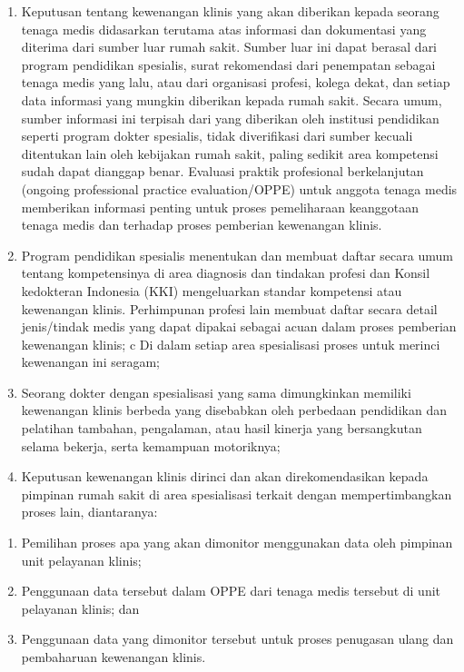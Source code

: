 \documentclass[
]{book}
\providecommand{\tightlist}{%
  \setlength{\itemsep}{0pt}\setlength{\parskip}{0pt}}
\begin{document}
\begin{enumerate}
\def\labelenumi{\alph{enumi}.}
\tightlist
\item
  Keputusan tentang kewenangan klinis yang akan diberikan kepada seorang tenaga medis didasarkan terutama atas informasi dan dokumentasi yang diterima dari sumber luar rumah sakit. Sumber luar ini dapat berasal dari program pendidikan spesialis, surat rekomendasi dari penempatan sebagai tenaga medis yang lalu, atau dari organisasi profesi, kolega dekat, dan setiap data informasi yang mungkin diberikan kepada rumah sakit. Secara umum, sumber informasi ini terpisah dari yang diberikan oleh institusi pendidikan seperti program dokter spesialis, tidak diverifikasi dari sumber kecuali ditentukan lain oleh kebijakan rumah sakit, paling sedikit area kompetensi sudah dapat dianggap benar.
  Evaluasi praktik profesional berkelanjutan (ongoing professional practice evaluation/OPPE) untuk anggota tenaga medis memberikan informasi penting untuk proses pemeliharaan keanggotaan tenaga medis dan terhadap proses pemberian kewenangan klinis.
\item
  Program pendidikan spesialis menentukan dan membuat daftar secara umum tentang kompetensinya di area diagnosis dan tindakan profesi dan Konsil kedokteran Indonesia (KKI) mengeluarkan standar kompetensi atau kewenangan klinis. Perhimpunan profesi lain membuat daftar secara detail jenis/tindak medis yang dapat dipakai sebagai acuan dalam proses pemberian kewenangan klinis;
  c Di dalam setiap area spesialisasi proses untuk merinci kewenangan ini seragam;
\item
  Seorang dokter dengan spesialisasi yang sama dimungkinkan memiliki kewenangan klinis berbeda yang disebabkan oleh perbedaan pendidikan dan pelatihan tambahan, pengalaman, atau hasil kinerja yang bersangkutan selama bekerja, serta kemampuan motoriknya;
\item
  Keputusan kewenangan klinis dirinci dan akan direkomendasikan kepada pimpinan rumah sakit di area spesialisasi terkait dengan mempertimbangkan proses lain, diantaranya:
\end{enumerate}

\begin{enumerate}
\def\labelenumi{\arabic{enumi}.}
\tightlist
\item
  Pemilihan proses apa yang akan dimonitor menggunakan data oleh pimpinan unit pelayanan klinis;
\item
  Penggunaan data tersebut dalam OPPE dari tenaga medis tersebut di unit pelayanan klinis; dan
\item
  Penggunaan data yang dimonitor tersebut untuk proses penugasan ulang dan pembaharuan kewenangan klinis.
\end{enumerate}
\end{document}
